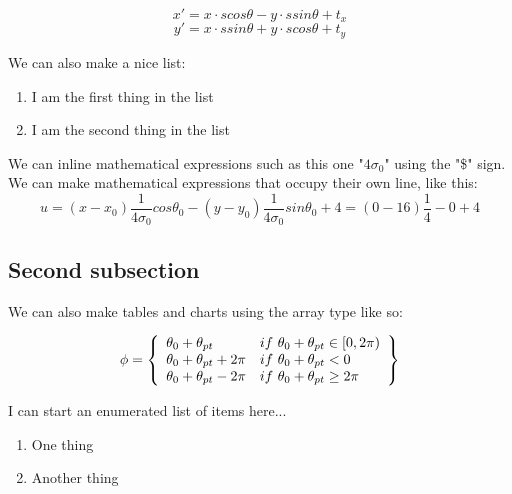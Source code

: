 \documentclass[a4paper,12pt]{article} %
\begin{document}
\vspace{2mm}
$$x' = x \cdot s cos \theta - y \cdot s sin \theta + t_x$$
$$y' = x \cdot s sin \theta + y \cdot s cos \theta + t_y$$
\vspace{2mm}

\noindent
We can also make a nice list:

\vspace{2mm}
\begin{enumerate}
\item I am the first thing in the list
\item I am the second thing in the list
\end{enumerate}
\vspace{2mm}

\noindent
We can inline mathematical expressions such as this one "$4 \sigma_0$" using the "\$" sign. We can make mathematical expressions that occupy their own line, like this: 
\vspace{2mm}
$$u = (x - x_0) \frac{1}{4 \sigma_0} cos \theta_0 - (y - y_0) \frac{1}{4 \sigma_0} sin \theta_0 + 4 = (0 - 16) \frac{1}{4} - 0 + 4$$
\vspace{2mm}

\subsection{Second subsection}

We can also make tables and charts using the array type like so:

\vspace{2mm}
\[ \phi = \left\{ 
\begin{array}{l l}

\theta_0 + \theta_{pt} & if \ \theta_0 + \theta_{pt} \in [0,2 \pi)\\ 

\theta_0 + \theta_{pt} + 2 \pi & if \ \theta_0 + \theta_{pt} < 0\\
\theta_0 + \theta_{pt} - 2 \pi & if \ \theta_0 + \theta_{pt} \ge 2 \pi\\

\end{array} \right\}
\] 
\vspace{2mm}

\noindent
I can start an enumerated list of items here...

\vspace{5mm}
\begin{enumerate}
\item One thing
\item Another thing
\end{enumerate}
\vspace{5mm}
\end{document}
